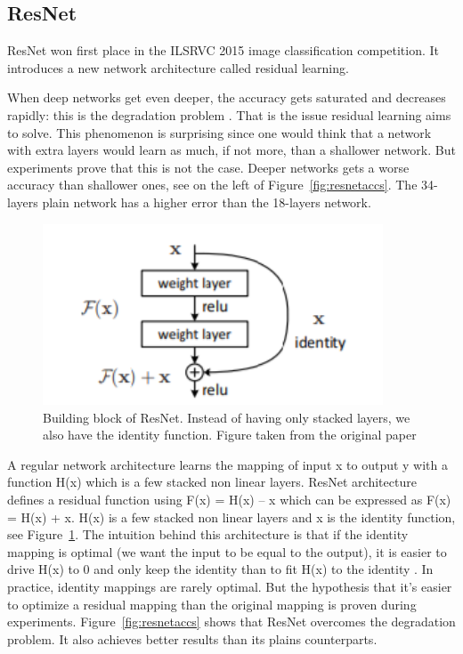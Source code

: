 \subsection{ResNet}
ResNet won first place in the ILSRVC 2015 image classification competition. It introduces a new network architecture called residual learning. 

When deep networks get even deeper, the accuracy gets saturated and decreases rapidly: this is the degradation problem \cite{resnetpaper}. That is the issue residual learning aims to solve. This phenomenon is surprising since one would think that a network with extra layers would learn as much, if not more, than a shallower network. But experiments prove that this is not the case. Deeper networks gets a worse accuracy than shallower ones, see on the left of Figure~\ref{fig:resnetaccs}. The 34-layers plain network has a higher error than the 18-layers network. 

\begin{figure}[!htp]
    \centering
        \includegraphics[width=0.9\textwidth]{figures/02-resnet_block}
        \caption[Building block of ResNet]{Building block of ResNet. Instead of having only stacked layers, we also have the identity function. Figure taken from the original paper \cite{resnetpaper}}\label{fig:resnetblock}
\end{figure}
A regular network architecture learns the mapping of input x to output y with a function H(x) which is a few stacked non linear layers. ResNet architecture defines a residual function using F(x) = H(x) – x which can be expressed as F(x) = H(x) + x. H(x) is a few stacked non linear layers and x is the identity function, see Figure~\ref{fig:resnetblock}. The intuition behind this architecture is that if the identity mapping is optimal (we want the input to be equal to the output), it is easier to drive H(x) to 0 and only keep the identity than to fit H(x) to the identity \cite{mediumresnet}. In practice, identity mappings are rarely optimal. But the hypothesis that it’s easier to optimize a residual mapping  than the original mapping is proven during experiments. Figure~\ref{fig:resnetaccs} shows that ResNet overcomes the degradation problem. It also achieves better results than its plains counterparts.


